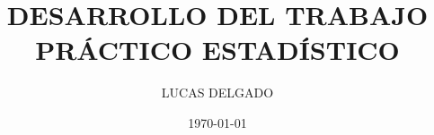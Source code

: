 \documentclass[letterpaper, 11pt]{article}
\newcommand{\1}{\mathds{1}}		%
\theoremstyle{definition}
\begin{document}

\title{\normalsize\MakeUppercase{\bfseries 
Desarrollo del trabajo práctico estadístico
}}
\author{\small\MakeUppercase{
Lucas Delgado}}
\date{\footnotesize\MakeUppercase\today}
\maketitle
\vspace{-1cm}




\end{document}

